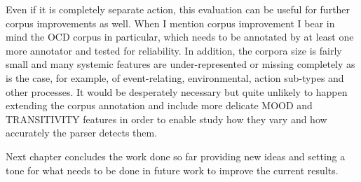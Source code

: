     Even if it is completely separate action, this evaluation can be useful for further corpus improvements as well. When I mention corpus improvement I bear in mind the OCD corpus in particular, which needs to be annotated by at least one more annotator and tested for reliability. In addition, the corpora size is fairly small and many systemic features are under-represented or missing completely as is the case, for example, of event-relating, environmental, action sub-types and other processes. It would be desperately necessary but quite unlikely to happen \citep[33]{mcenery2006corpus} extending the corpus annotation and include more delicate MOOD and TRANSITIVITY features in order to enable study how they vary and how accurately the parser detects them. 
    
    Next chapter concludes the work done so far providing new ideas and setting a tone for what needs to be done in future work to improve the current results.